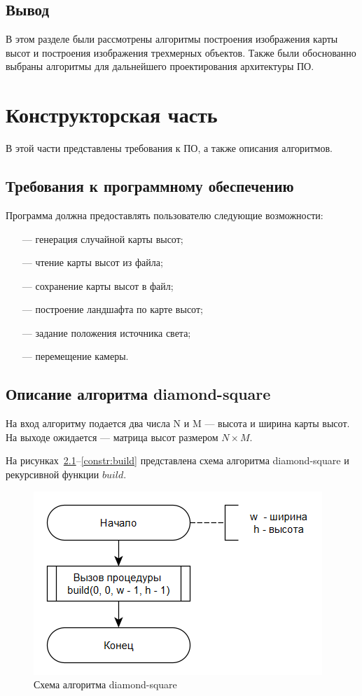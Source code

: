 \documentclass[a4paper, 14pt]{extreport}
\begin{document}
\section{Вывод}

В этом разделе были рассмотрены алгоритмы построения изображения карты высот и построения изображения трехмерных
объектов. Также были обоснованно выбраны алгоритмы для дальнейшего проектирования архитектуры ПО.

\chapter{Конструкторская часть}

В этой части представлены требования к ПО, а также описания алгоритмов.

\section{Требования к программному обеспечению}

Программа должна предоставлять пользователю следующие возможности:
\begin{itemize}
	\item[---] генерация случайной карты высот;
	\item[---] чтение карты высот из файла;
	\item[---] сохранение карты высот в файл;
	\item[---] построение ландшафта по карте высот;
	\item[---] задание положения источника света;
	\item[---] перемещение камеры.
\end{itemize}

\section{Описание алгоритма diamond-square}

На вход алгоритму подается два числа N и M --- высота и ширина карты высот. На выходе ожидается  --- матрица 
высот размером $N \times M$. 

На рисунках~\ref{constr:ds}--\ref{constr:build} представлена схема алгоритма diamond-square и рекурсивной функции $build$.

\begin{figure}[h]
	\centering
	\includegraphics[scale=0.9]{tools/alg_ds.png}
	\caption{Схема алгоритма diamond-square}
	\label{constr:ds}
\end{figure}
\end{document}
